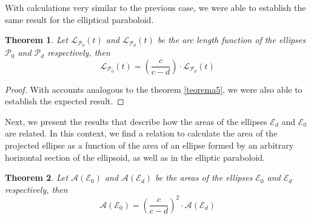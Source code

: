 \documentclass{amsart}
\theoremstyle{plain}
\newtheorem{theorem}{\bf Theorem}
\numberwithin{equation}{section}
\begin{document}
With calculations very similar to the previous case, we were able to establish the same result for the elliptical paraboloid.

\begin{theorem}\label{teorema6}
	Let \( \mathcal{L}_{\mathcal{P}_0}(t) \) and \( \mathcal{L}_{\mathcal{P}_d}(t) \) be the arc length function of the ellipses \( \mathcal{P}_0 \) and \( \mathcal{P}_d \) respectively, then
	\begin{equation}
		\mathcal{L}_{\mathcal{P}_0}(t) = \left(\frac{c}{c-d} \right) \cdot \mathcal{L}_{\mathcal{P}_d}(t)
	\end{equation}
\end{theorem}

\begin{proof}
	
	With accounts analogous to the theorem \ref{teorema5}, we were also able to establish the expected result.
	
\end{proof}



\vspace{0.5cm}

\begin{center}
	\centering
	\footnotesize
\end{center}

Next, we present the results that describe how the areas of the ellipses $\mathcal{E}_d$ and $\mathcal{E}_0$ are related. In this context, we find a relation to calculate the area of the projected ellipse as a function of the area of an ellipse formed by an arbitrary horizontal section of the ellipsoid, as well as in the elliptic paraboloid.

\begin{theorem}\label{teorema7}
	Let \( \mathcal{A}(\mathcal{E}_0) \) and \( \mathcal{A}(\mathcal{E}_d) \) be the areas of the ellipses \( \mathcal{E}_0 \) and \( \mathcal{E}_d \) respectively, then
	\begin{equation}
		\mathcal{A}(\mathcal{E}_0) = \left(\frac{c}{c-d} \right)^{2} \cdot \mathcal{A}(\mathcal{E}_d)
	\end{equation}
\end{theorem}
\end{document}
